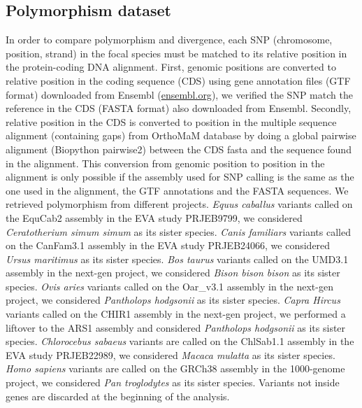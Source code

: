 \documentclass{article}
\begin{document}
    \subsection*{Polymorphism dataset}

    In order to compare polymorphism and divergence, each SNP (chromosome, position, strand) in the focal species must be matched to its relative position in the protein-coding DNA alignment.
    First, genomic positions are converted to relative position in the coding sequence (CDS) using gene annotation files (GTF format) downloaded from Ensembl (\url{ensembl.org}), we verified the SNP match the reference in the CDS (FASTA format) also downloaded from Ensembl.
    Secondly, relative position in the CDS is converted to position in the multiple sequence alignment (containing gaps) from OrthoMaM database\cite{ranwez_orthomam_2007, douzery_orthomam_2014, scornavacca_orthomam_2019} by doing a global pairwise alignment (Biopython pairwise2) between the CDS fasta and the sequence found in the alignment.
    This conversion from genomic position to position in the alignment is only possible if the assembly used for SNP calling is the same as the one used in the alignment, the GTF annotations and the FASTA sequences.
    We retrieved polymorphism from different projects.
    \textit{Equus caballus} variants called on the EquCab2 assembly in the EVA study PRJEB9799, we considered \textit{Ceratotherium simum simum} as its sister species.
    \textit{Canis familiars} variants called on the CanFam3.1 assembly in the EVA study PRJEB24066, we considered \textit{Ursus maritimus} as its sister species.
    \textit{Bos taurus} variants called on the UMD3.1 assembly in the next-gen project, we considered \textit{Bison bison bison} as its sister species.
    \textit{Ovis aries} variants called on the Oar\_v3.1 assembly in the next-gen project, we considered \textit{Pantholops hodgsonii} as its sister species.
    \textit{Capra Hircus} variants called on the CHIR1 assembly in the next-gen project, we performed a liftover to the ARS1 assembly and considered \textit{Pantholops hodgsonii} as its sister species.
    \textit{Chlorocebus sabaeus} variants are called on the ChlSab1.1 assembly in the EVA study PRJEB22989\cite{svardal_ancient_2017}, we considered \textit{Macaca mulatta} as its sister species.
    \textit{Homo sapiens} variants are called on the GRCh38 assembly in the 1000-genome project\cite{consortium_integrated_2012, the1000genomesprojectconsortium_global_2015}, we considered \textit{Pan troglodytes} as its sister species.
    Variants not inside genes are discarded at the beginning of the analysis.
\end{document}
